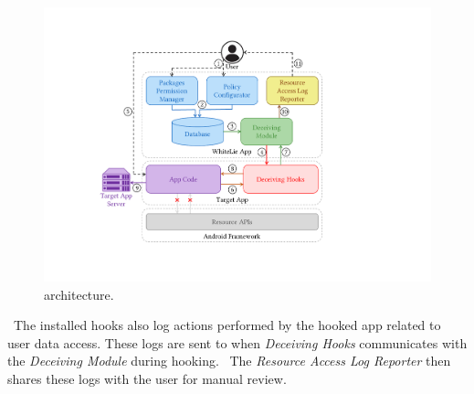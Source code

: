 \begin{figure}[t]
    \centering
    \includegraphics[width=0.65\linewidth]{Figures/Methodology/deceiver_working_architecture.pdf}
    \caption{\framework{} architecture.}
    \label{fig:method_frmwrkArch}
\end{figure}


~The installed hooks also log actions performed by the hooked app related to user data access. These logs are sent to \framework{} when \textit{Deceiving Hooks} communicates with the \textit{Deceiving Module} during hooking. ~The \textit{Resource Access Log Reporter} then shares these logs with the user for manual review. 
